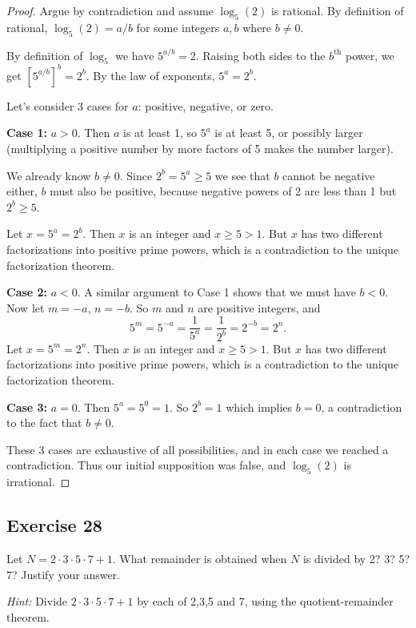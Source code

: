 \documentclass[14pt]{extarticle}
\begin{document}
\begin{proof}
    Argue by contradiction and assume $\log_5(2)$ is rational. By definition of rational, $\log_5(2) = a/b$ for some integers $a, b$ where $b \neq 0$.

    By definition of $\log_5$ we have $5^{a/b} = 2$. Raising both sides to the $b^{\text{th}}$ power, we get $[5^{a/b}]^b = 2^b$. By the law of exponents, $5^a = 2^b$.

    Let's consider 3 cases for $a$: positive, negative, or zero.

        {\bf Case 1:} $a > 0$. Then $a$ is at least 1, so $5^a$ is at least 5, or possibly larger (multiplying a positive number by more factors of 5 makes the number larger).

    We already know $b \neq 0$. Since $2^b = 5^a \geq 5$ we see that $b$ cannot be negative either, $b$ must also be positive, because negative powers of 2 are less than 1 but $2^b \geq 5$.

    Let $x = 5^a = 2^b$. Then $x$ is an integer and $x \geq 5 > 1$. But $x$ has two different factorizations into positive prime powers, which is a contradiction to the unique factorization theorem.

        {\bf Case 2:} $a < 0$. A similar argument to Case 1 shows that we must have $b < 0$. Now let $m = -a$, $n = -b$. So $m$ and $n$ are positive integers, and
    \[
        5^m = 5^{-a} = \frac{1}{5^a} = \frac{1}{2^b} = 2^{-b} = 2^n.
    \]
    Let $x = 5^m = 2^n$. Then $x$ is an integer and $x \geq 5 > 1$. But $x$ has two different factorizations into positive prime powers, which is a contradiction to the unique factorization theorem.

        {\bf Case 3:} $a = 0$. Then $5^a = 5^0 = 1$. So $2^b = 1$ which implies $b = 0$, a contradiction to the fact that $b \neq 0$.

    These 3 cases are exhaustive of all possibilities, and in each case we reached a contradiction. Thus our initial supposition was false, and $\log_5(2)$ is irrational.
\end{proof}

\subsection{Exercise 28}
Let $N = 2\cdot3\cdot5\cdot7 + 1$. What remainder is obtained when $N$ is divided by 2? 3? 5? 7? Justify your answer.

    {\it Hint:} Divide $2\cdot3\cdot5\cdot7 + 1$ by each of 2,3,5 and 7, using the quotient-remainder theorem.
\end{document}
